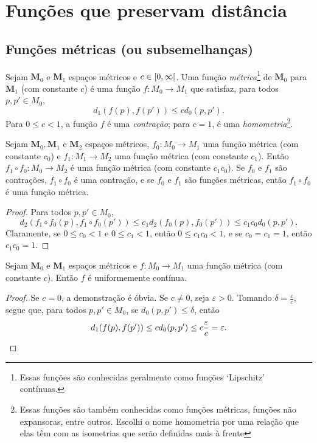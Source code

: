 \section{Funções que preservam distância}

\subsection{Funções métricas (ou subsemelhanças)}

\begin{definition}
Sejam $\bm M_0$ e $\bm M_1$ espaços métricos e $c \in \left[{0},{\infty}\right[$. Uma função \emph{métrica}\footnote{Essas funções são conhecidas geralmente como funções `Lipschitz' contínuas.} de $\bm M_0$ para $\bm M_1$ (com constante $c$) é uma função $f\colon M_0 \to M_1$ que satisfaz, para todos $p,p' \in M_0$,
	\begin{equation*}
	d_1(f(p),f(p')) \leq cd_0(p,p').
	\end{equation*}
Para $0 \leq c < 1$, a função $f$ é uma \emph{contração}; para $c=1$, é uma \emph{homometria}\footnote{Essas funções são também conhecidas como funções métricas, funções não expansoras, entre outros. Escolhi o nome homometria por uma relação que elas têm com as isometrias que serão definidas mais à frente}.
\end{definition}

\begin{proposition}
Sejam $\bm M_0, \bm M_1$ e $\bm M_2$ espaços métricos, $f_0\colon M_0 \to M_1$ uma função métrica (com constante $c_0$) e $f_1\colon M_1 \to M_2$ uma função métrica (com constante $c_1$). Então $f_1 \circ f_0\colon M_0 \to M_2$ é uma função métrica (com constante $c_1c_0$). Se $f_0$ e $f_1$ são contrações, $f_1 \circ f_0$ é uma contração, e se $f_0$ e $f_1$ são funções métricas, então $f_1 \circ f_0$ é uma função métrica.
\end{proposition}
\begin{proof}
Para todos $p,p' \in M_0$,
	\begin{equation*}
	d_2(f_1 \circ f_0(p),f_1 \circ f_0(p')) \leq c_1d_2(f_0(p),f_0(p')) \leq c_1c_0d_0(p,p').
	\end{equation*}
Claramente, se $0 \leq c_0 < 1$ e $0 \leq c_1 < 1$, então $0 \leq c_1c_0 < 1$, e se $c_0=c_1=1$, então $c_1c_0=1$.
\end{proof}

\begin{proposition}
Sejam $\bm M_0$ e $\bm M_1$ espaços métricos e $f\colon M_0 \to M_1$ uma função métrica (com constante $c$). Então $f$ é uniformemente contínua.
\end{proposition}
\begin{proof}
Se $c=0$, a demonstração é óbvia. Se $c \neq 0$, seja $\varepsilon>0$. Tomando $\delta=\frac{\varepsilon}{c}$, segue que, para todos $p,p' \in M_0$, se $d_0(p,p') \leq \delta$, então
	\begin{equation*}
	d_1(f(p),f(p')) \leq cd_0(p,p') \leq c\frac{\varepsilon}{c}=\varepsilon. \qedhere
	\end{equation*}
\end{proof}

